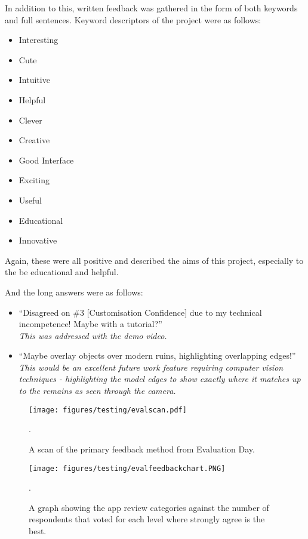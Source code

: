\documentclass[12pt, a4paper]{article}
\begin{document}
In addition to this, written feedback was gathered in the form of both keywords and full sentences. Keyword descriptors of the project were as follows:
\begin{multicols}{2}
\begin{itemize}
    \item Interesting
    \item Cute
    \item Intuitive
    \item Helpful
    \item Clever
    \item Creative
\end{itemize}
\columnbreak
\begin{itemize}
    \item Good Interface
    \item Exciting
    \item Useful
    \item Educational 
    \item Innovative
\end{itemize}
\vfill\null
\end{multicols}
Again, these were all positive and described the aims of this project, especially to the be educational and helpful.

And the long answers were as follows:
\begin{itemize}
    \item ``Disagreed on \#3 [Customisation Confidence] due to my technical incompetence! Maybe with a tutorial?''\\
    \textit{This was addressed with the demo video.}
    \item ``Maybe overlay objects over modern ruins, highlighting overlapping edges!'' \\
    \textit{This would be an excellent future work feature requiring computer vision techniques - highlighting the model edges to show exactly where it matches up to the remains as seen through the camera.}
\end{itemize}

\begin{figure}
    \texttt{[image: figures/testing/evalscan.pdf]}
        \caption{A scan of the primary feedback method from Evaluation Day.}.
        \label{fig:evalscan}
\end{figure}

\begin{figure}
    \texttt{[image: figures/testing/evalfeedbackchart.PNG]}
        \caption{A graph showing the app review categories against the number of respondents that voted for each level where strongly agree is the best.}.
        \label{fig:evalplot}
\end{figure}
\end{document}
